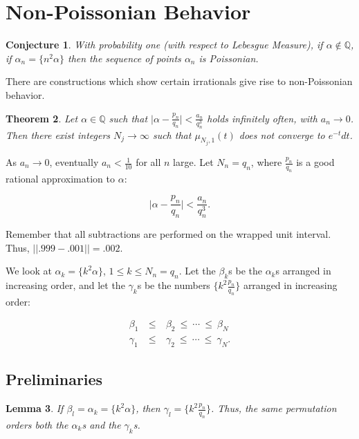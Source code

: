 \documentclass[12pt,letterpaper]{report}
\newcommand\be{\begin{equation}}
\newcommand\ee{\end{equation}}
\newcommand\bea{\begin{eqnarray}}
\newcommand\eea{\end{eqnarray}}
\newcommand{\Q}{\mathbb{Q}}
\newtheorem{thm}{Theorem}[section]
\newtheorem{conj}[thm]{Conjecture}
\newtheorem{lem}[thm]{Lemma}
\newcommand{\pn}{p_n}
\newcommand{\qn}{q_n}
\begin{document}
\section{Non-Poissonian Behavior}

\begin{conj} With probability one (with respect to Lebesgue Measure),
if $\alpha \not\in \Q$, if
$\alpha_n = \{n^2 \alpha\}$ then the sequence of points $\alpha_n$
is Poissonian.
\end{conj}

There are constructions which show certain irrationals give rise
to non-Poissonian behavior.

\begin{thm}\label{thmnonpoisson} Let $\alpha \in \Q$ such that $\Big| \alpha -
\frac{\pn}{\qn} \Big| < \frac{a_n}{q_n^3}$ holds infinitely often,
with $a_n \to 0$. Then there exist integers $N_j \to \infty$ such
that $\mu_{N_j,1}(t)$ does not converge to $e^{-t}dt$. \end{thm}

As $a_n \to 0$, eventually $a_n < \frac{1}{10}$ for all $n$ large.
Let $N_n = q_n$, where $\frac{\pn}{\qn}$ is a good rational
approximation to $\alpha$:

\be\label{eqpnqngoodapproxalpha} \Big| \alpha - \frac{\pn}{\qn}
\Big| < \frac{a_n}{q_n^3}. \ee

Remember that all subtractions are performed on the wrapped unit
interval. Thus, $||.999 - .001|| = .002$.

We look at $\alpha_k = \{k^2 \alpha\}$, $1 \le k \le N_n =\qn$.
Let the $\beta_k$s be the $\alpha_k$s arranged in increasing
order, and let the $\gamma_k$s be the numbers $\{k^2
\frac{\pn}{\qn} \}$ arranged in increasing order:

\bea \beta_1 & \ \le \ & \beta_2 \  \le \ \cdots \ \le \ \beta_N
\nonumber\\ \gamma_1 & \ \le \ & \gamma_2 \  \le \ \cdots \ \le \
\gamma_N. \eea

\subsection{Preliminaries}

\begin{lem} If $\beta_l = \alpha_k = \{k^2 \alpha\}$, then $\gamma_l =
 \{k^2 \frac{\pn}{\qn}\}$. Thus, the same permutation orders both the
$\alpha_k$s and the $\gamma_k$s. \end{lem}
\end{document}
